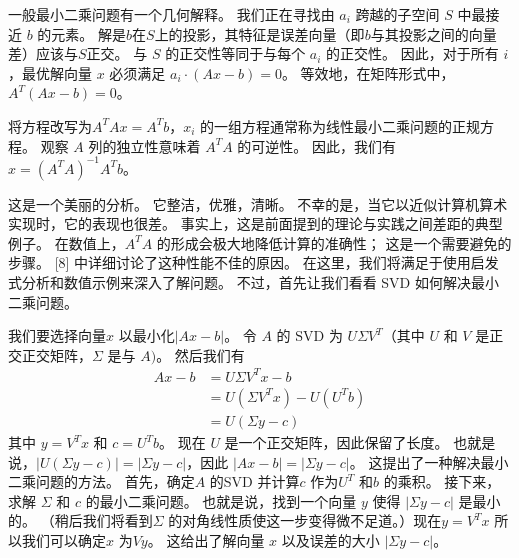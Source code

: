 \documentclass[11pt,a4paper,twoside]{article}
\begin{document}
\begin{CJK}{UTF8}{gbsn}
一般最小二乘问题有一个几何解释。 我们正在寻找由 $a_{i}$ 跨越的子空间 $S$ 中最接近 $b$ 的元素。 解是$b$在$S$上的投影，其特征是误差向量（即$b$与其投影之间的向量差）应该与$S$正交。 与 $S$ 的正交性等同于与每个 $a_{i}$ 的正交性。 因此，对于所有 $i$，最优解向量 $x$ 必须满足 $a_{i} \cdot(A x-b)=0$。 等效地，在矩阵形式中，$A^{T}(A x-b)=0$。

将方程改写为$A^{T} A x=A^{T} b$，$x_{i}$ 的一组方程通常称为线性最小二乘问题的正规方程。 观察 $A$ 列的独立性意味着 $A^{T} A$ 的可逆性。 因此，我们有 $x=\left(A^{T} A\right)^{-1} A^{T} b$。

这是一个美丽的分析。 它整洁，优雅，清晰。 不幸的是，当它以近似计算机算术实现时，它的表现也很差。 事实上，这是前面提到的理论与实践之间差距的典型例子。 在数值上，$A^{T} A$ 的形成会极大地降低计算的准确性； 这是一个需要避免的步骤。 [8] 中详细讨论了这种性能不佳的原因。 在这里，我们将满足于使用启发式分析和数值示例来深入了解问题。 不过，首先让我们看看 SVD 如何解决最小二乘问题。

我们要选择向量$x$ 以最小化$|A x-b|$。 令 $A$ 的 $\mathrm{SVD}$ 为 $U \Sigma V^{T}$（其中 $U$ 和 $V$ 是正交正交矩阵，$\Sigma$ 是与 $A)$。 然后我们有
$$
\begin{aligned}
A x-b &=U \Sigma V^{T} x-b \\
&=U\left(\Sigma V^{T} x\right)-U\left(U^{T} b\right) \\
&=U(\Sigma y-c)
\end{aligned}
$$
其中 $y=V^{T} x$ 和 $c=U^{T} b$。 现在 $U$ 是一个正交矩阵，因此保留了长度。 也就是说，$|U(\Sigma y-c)|=|\Sigma y-c|$，因此 $|A x-b|=|\Sigma y-c|$。 这提出了一种解决最小二乘问题的方法。 首先，确定$A$ 的SVD 并计算$c$ 作为$U^{T}$ 和$b$ 的乘积。 接下来，求解 $\Sigma$ 和 $c$ 的最小二乘问题。 也就是说，找到一个向量 $y$ 使得 $|\Sigma y-c|$ 是最小的。 （稍后我们将看到$\Sigma$ 的对角线性质使这一步变得微不足道。）现在$y=V^{T} x$ 所以我们可以确定$x$ 为$V y$。 这给出了解向量 $x$ 以及误差的大小 $|\Sigma y-c|$。


\end{CJK}
\end{document}
